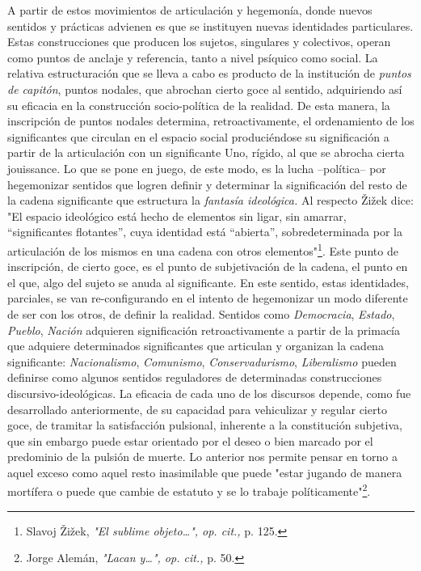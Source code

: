 A partir de estos movimientos de articulación y hegemonía, donde nuevos
sentidos y prácticas advienen es que se instituyen nuevas identidades
particulares. Estas construcciones que producen los sujetos, singulares
y colectivos, operan como puntos de anclaje y referencia, tanto a nivel
psíquico como social. La relativa estructuración que se lleva a cabo es
producto de la institución de \emph{puntos de capitón}, puntos nodales,
que abrochan cierto goce al sentido, adquiriendo así su eficacia en la
construcción socio-política de la realidad. De esta manera, la
inscripción de puntos nodales determina, retroactivamente, el
ordenamiento de los significantes que circulan en el espacio social
produciéndose su significación a partir de la articulación con un
significante Uno, rígido, al que se abrocha cierta jouissance. Lo que se
pone en juego, de este modo, es la lucha --política-- por hegemonizar
sentidos que logren definir y determinar la significación del resto de
la cadena significante que estructura la \emph{fantasía ideológica.} Al
respecto Žižek dice: "El espacio ideológico está hecho de elementos sin
ligar, sin amarrar, ``significantes flotantes'', cuya identidad está
``abierta'', sobredeterminada por la articulación de los mismos en una
cadena con otros elementos"\footnote{Slavoj Žižek, \emph{"El sublime
  objeto\ldots", op. cit.,} p. 125.}. Este punto de inscripción, de
cierto goce, es el punto de subjetivación de la cadena, el punto en el
que, algo del sujeto se anuda al significante. En este sentido, estas
identidades, parciales, se van re-configurando en el intento de
hegemonizar un modo diferente de ser con los otros, de definir la
realidad. Sentidos como \emph{Democracia}, \emph{Estado}, \emph{Pueblo},
\emph{Nación} adquieren significación retroactivamente a partir de la
primacía que adquiere determinados significantes que articulan y
organizan la cadena significante: \emph{Nacionalismo}, \emph{Comunismo},
\emph{Conservadurismo}, \emph{Liberalismo} pueden definirse como algunos
sentidos reguladores de determinadas construcciones
discursivo-ideológicas. La eficacia de cada uno de los discursos
depende, como fue desarrollado anteriormente, de su capacidad para
vehiculizar y regular cierto goce, de tramitar la satisfacción
pulsional, inherente a la constitución subjetiva, que sin embargo puede
estar orientado por el deseo o bien marcado por el predominio de la
pulsión de muerte. Lo anterior nos permite pensar en torno a aquel
exceso como aquel resto inasimilable que puede "estar jugando de manera
mortífera o puede que cambie de estatuto y se lo trabaje
políticamente"\footnote{Jorge Alemán, \emph{"Lacan y\ldots", op. cit.,}
  p. 50.}.

